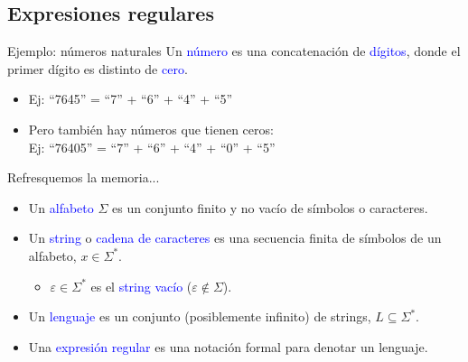\documentclass[handout]{beamer} %
\newcommand{\blue}[1]{\textcolor{blue}{#1}}
\begin{document}
\subsection{Expresiones regulares}

\begin{frame}{Ejemplo: números naturales}
    Un \blue{número} es una concatenación de \blue{dígitos}, donde el primer dígito es distinto de \blue{cero}.
    \begin{itemize}
        \item<2-> Ej: ``7645'' = ``7'' + ``6'' + ``4'' + ``5''
        \item<3-> Pero también hay números que tienen ceros:\\
        Ej: ``76405'' = ``7'' + ``6'' + ``4'' + ``0'' + ``5''
    \end{itemize}
\end{frame}

\begin{frame}{Refresquemos la memoria...}
    \begin{itemize}
        \item<1-> Un \blue{alfabeto} $\Sigma$ es un conjunto finito y no vacío de símbolos o caracteres.
        \item<2-> Un \blue{string} o \blue{cadena de caracteres} es una secuencia finita de símbolos de un alfabeto, $x\in\Sigma^*$.
        \begin{itemize}
            \item<3-> $\varepsilon\in\Sigma^*$ es el \blue{string vacío} ($\varepsilon\notin\Sigma$).
        \end{itemize}
        \item<4-> Un \blue{lenguaje} es un conjunto (posiblemente infinito) de strings, $L\subseteq\Sigma^*$.
        \item<5-> Una \blue{expresión regular} es una notación formal para denotar un lenguaje.
    \end{itemize}
\end{frame}
\end{document}
